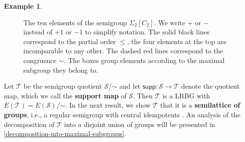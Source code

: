 \documentclass[11pt, oneside, reqno]{amsart}
\theoremstyle{definition}
\newtheorem{example}[theorem]{Example}
\numberwithin{equation}{section}
\newcommand{\defn}[1]{{\color{RoyalBlue}\bf#1}}
\def \SS{{\mathcal{S}}}
\def \TT{{\mathcal{T}}}
\def \ztwo {{C_2}}
\def \supp{\mathsf{supp}}
\begin{document}
\begin{example}
\begin{figure}[ht]
        \caption{The ten elements of the semigroup $\Sigma_2[\ztwo]$.
        We write $+$ or $-$ instead of $+1$ or $-1$ to simplify notation.
        The solid black lines correspond to the partial order $\leq$, the four elements at the top are incomparable to any other.
        The dashed red lines correspond to the congruence $\sim$.
        The boxes group elements according to the maximal subgroup they belong to.}
        \label{fig:hsiao-C2-relations}
    \end{figure}
\end{example}

Let $\TT$ be the semigroup quotient $\SS/\mathord{\sim}$ and let $\supp: \SS
\to \TT$ denote the quotient map, which we call the \defn{support map} of
$\SS$. Then $\TT$ is a LRBG with $E(\TT) = E(\SS)/\mathord{\sim}$.
In the next result, we show $\TT$ that it is a \defn{semilattice of groups},
i.e., a regular semigroup with central idempotents \cite{cp61semigroupsI}.
An analysis of the decomposition of $\TT$ into a disjoint union of groups will
be presented in \cref{decomposition-into-maximal-subgroups}.
\end{document}
